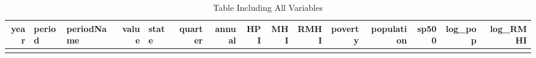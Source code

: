 \documentclass[
]{article}
\begin{document}
\begin{longtable}[]{@{}rllrlrrrrrrrrrr@{}}
\caption{Table Including All Variables}\tabularnewline
\toprule
\begin{minipage}[b]{0.03\columnwidth}\raggedleft
year\strut
\end{minipage} & \begin{minipage}[b]{0.04\columnwidth}\raggedright
period\strut
\end{minipage} & \begin{minipage}[b]{0.06\columnwidth}\raggedright
periodName\strut
\end{minipage} & \begin{minipage}[b]{0.03\columnwidth}\raggedleft
value\strut
\end{minipage} & \begin{minipage}[b]{0.03\columnwidth}\raggedright
state\strut
\end{minipage} & \begin{minipage}[b]{0.05\columnwidth}\raggedleft
quarter\strut
\end{minipage} & \begin{minipage}[b]{0.04\columnwidth}\raggedleft
annual\strut
\end{minipage} & \begin{minipage}[b]{0.04\columnwidth}\raggedleft
HPI\strut
\end{minipage} & \begin{minipage}[b]{0.03\columnwidth}\raggedleft
MHI\strut
\end{minipage} & \begin{minipage}[b]{0.03\columnwidth}\raggedleft
RMHI\strut
\end{minipage} & \begin{minipage}[b]{0.05\columnwidth}\raggedleft
poverty\strut
\end{minipage} & \begin{minipage}[b]{0.06\columnwidth}\raggedleft
population\strut
\end{minipage} & \begin{minipage}[b]{0.03\columnwidth}\raggedleft
sp500\strut
\end{minipage} & \begin{minipage}[b]{0.05\columnwidth}\raggedleft
log\_pop\strut
\end{minipage} & \begin{minipage}[b]{0.05\columnwidth}\raggedleft
log\_RMHI\strut
\end{minipage}\tabularnewline
\midrule
\endfirsthead
\toprule
\begin{minipage}[b]{0.03\columnwidth}\raggedleft

\end{minipage}
\end{longtable}
\end{document}
